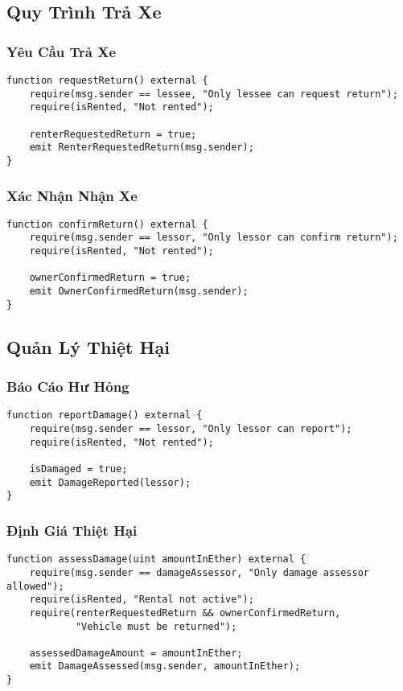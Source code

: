 \documentclass[12pt,a4paper]{article}
\begin{document}
\subsection{Quy Trình Trả Xe}

\subsubsection{Yêu Cầu Trả Xe}
\begin{lstlisting}[language=Solidity, caption=Người thuê yêu cầu trả xe]
function requestReturn() external {
    require(msg.sender == lessee, "Only lessee can request return");
    require(isRented, "Not rented");

    renterRequestedReturn = true;
    emit RenterRequestedReturn(msg.sender);
}
\end{lstlisting}

\subsubsection{Xác Nhận Nhận Xe}
\begin{lstlisting}[language=Solidity, caption=Chủ xe xác nhận nhận xe]
function confirmReturn() external {
    require(msg.sender == lessor, "Only lessor can confirm return");
    require(isRented, "Not rented");

    ownerConfirmedReturn = true;
    emit OwnerConfirmedReturn(msg.sender);
}
\end{lstlisting}

\subsection{Quản Lý Thiệt Hại}

\subsubsection{Báo Cáo Hư Hỏng}
\begin{lstlisting}[language=Solidity, caption=Chủ xe báo cáo hư hỏng]
function reportDamage() external {
    require(msg.sender == lessor, "Only lessor can report");
    require(isRented, "Not rented");

    isDamaged = true;
    emit DamageReported(lessor);
}
\end{lstlisting}

\subsubsection{Định Giá Thiệt Hại}
\begin{lstlisting}[language=Solidity, caption=Người định giá đánh giá thiệt hại]
function assessDamage(uint amountInEther) external {
    require(msg.sender == damageAssessor, "Only damage assessor allowed");
    require(isRented, "Rental not active");
    require(renterRequestedReturn && ownerConfirmedReturn, 
            "Vehicle must be returned");

    assessedDamageAmount = amountInEther;
    emit DamageAssessed(msg.sender, amountInEther);
}
\end{lstlisting}
\end{document}
